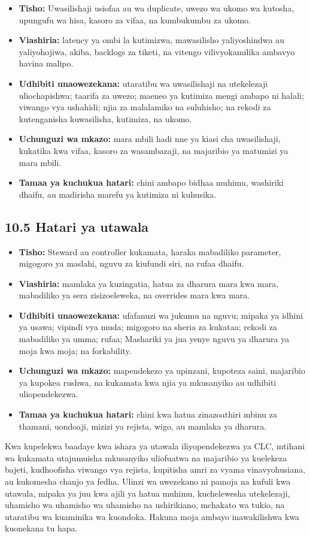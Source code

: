 \documentclass[11pt]{article}
\begin{document}
\begin{itemize}[leftmargin=*]
\item \textbf{Tisho:} Uwasilishaji usiofaa au wa duplicate, uwezo wa ukomo wa kutosha, upungufu wa hisa, kasoro za vifaa, na kumbukumbu za ukomo.
\item \textbf{Viashiria:} latency ya ombi la kutimizwa, mawasilisho yaliyoshindwa au yaliyohojiwa, akiba, backlogs za tiketi, na vitengo vilivyokamilika ambavyo havina malipo.
\item \textbf{Udhibiti unaowezekana:} utaratibu wa uwasilishaji na utekelezaji uliochapishwa; taarifa za uwezo; maeneo ya kutimiza mengi ambapo ni halali; viwango vya ushahidi; njia za malalamiko na suluhisho; na rekodi za kutenganisha kuwasilisha, kutimiza, na ukomo.
\item \textbf{Uchunguzi wa mkazo:} mara mbili hadi nne ya kiasi cha uwasilishaji, kukatika kwa vifaa, kasoro za wasambazaji, na majaribio ya matumizi ya mara mbili.
\item \textbf{Tamaa ya kuchukua hatari:} chini ambapo bidhaa muhimu, washiriki dhaifu, au madirisha marefu ya kutimiza ni kuhusika.
\end{itemize}
\subsection*{10.5 Hatari ya utawala}

\begin{itemize}[leftmargin=*]
\item \textbf{Tisho:} Steward au controller kukamata, haraka mabadiliko parameter, migogoro ya maslahi, nguvu za kiufundi siri, na rufaa dhaifu.
\item \textbf{Viashiria:} mamlaka ya kuzingatia, hatua za dharura mara kwa mara, mabadiliko ya sera zisizoeleweka, na overrides mara kwa mara.
\item \textbf{Udhibiti unaowezekana:} ufafanuzi wa jukumu na nguvu; mipaka ya idhini ya usawa; vipindi vya muda; migogoro na sheria za kukataa; rekodi za mabadiliko ya umma; rufaa; Mashariki ya jua yenye nguvu ya dharura ya moja kwa moja; na forkability.
\item \textbf{Uchunguzi wa mkazo:} mapendekezo ya upinzani, kupoteza saini, majaribio ya kupokea rushwa, na kukamata kwa njia ya mkusanyiko au udhibiti uliopendekezwa.
\item \textbf{Tamaa ya kuchukua hatari:} chini kwa hatua zinazoathiri mbinu za thamani, uondoaji, mizizi ya rejista, wigo, au mamlaka ya dharura.
\end{itemize}
Kwa kupelekwa baadaye kwa ishara ya utawala iliyopendekezwa ya CLC, mtihani wa kukamata utajumuisha mkusanyiko uliofuatwa na majaribio ya kuelekeza bajeti, kudhoofisha viwango vya rejista, kupitisha amri za vyama vinavyohusiana, au kukomesha chanjo ya fedha. Ulinzi wa uwezekano ni pamoja na kufuli kwa utawala, mipaka ya juu kwa ajili ya hatua muhimu, kuchelewesha utekelezaji, uhamisho wa uhamisho wa uhamisho na ushirikiano, mchakato wa tukio, na utaratibu wa kuaminika wa kuondoka. Hakuna moja ambayo inawakilishwa kwa kuonekana tu hapa.
\end{document}
